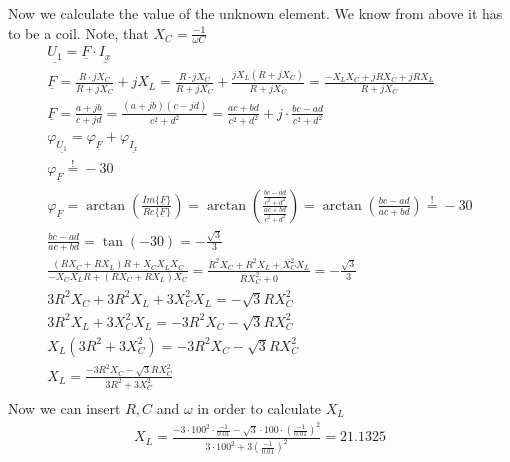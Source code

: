 \documentclass[a4paper]{article}
\begin{document}
Now we calculate the value of the unknown element. We know from above it has to be a coil.
Note, that $X_C = \frac{-1}{\omega C}$
\begin{align*}
	\underline{U_1} = \underline{F} \cdot \underline{I_x}\\
	\underline{F} = \frac{R \cdot jX_C}{R + jX_C} + jX_L =
	\frac{R \cdot jX_C}{R + jX_C} + \frac{jX_L(R+jX_C)}{R + jX_C} = \frac{-X_LX_C + jRX_C + jRX_L}{R + jX_C}\\
	\underline{F} = \frac{a+jb}{c+jd} = \frac{(a+jb)(c-jd)}{c^2+d^2} = \frac{ac+bd}{c^2+d^2} + j\cdot\frac{bc-ad}{c^2+d^2}\\
	\varphi_{\underline{U_1}} = \varphi_{\underline{F}} + \varphi_{\underline{I_x}}\\
	\varphi_{\underline{F}} \overset{!}{=} -30\\
	\varphi_{\underline{F}} = \arctan \left(\frac{Im\{\underline{F}\}}{Re\{\underline{F}\}} \right) =
	\arctan \left(\frac{\frac{bc-ad}{c^2+d^2}}{\frac{ac+bd}{c^2+d^2}} \right) =
	\arctan \left(\frac{bc-ad}{ac+bd} \right) \overset{!}{=} -30\\
	\frac{bc-ad}{ac+bd} = \tan(-30) = -\frac{\sqrt{3}}{3}\\
	\frac{(RX_C+RX_L)R + X_CX_LX_C}{-X_CX_LR + (RX_C + RX_L)X_C} = 
	\frac{R^2X_C + R^2X_L + X_C^2X_L}{RX_C^2 + 0} = -\frac{\sqrt{3}}{3}\\
	3R^2X_C + 3R^2X_L + 3X_C^2X_L = -\sqrt{3}RX_C^2\\
	3R^2X_L + 3X_C^2X_L = -3R^2X_C -\sqrt{3}RX_C^2\\
	X_L(3R^2 + 3X_C^2) = -3R^2X_C -\sqrt{3}RX_C^2\\
	X_L = \frac{-3R^2X_C -\sqrt{3}RX_C^2}{3R^2 + 3X_C^2}\\
\end{align*}
Now we can insert $R, C$ and $\omega$ in order to calculate $X_L$
\begin{align*}
	X_L = \frac{-3 \cdot 100^2 \cdot \frac{-1}{0.01} -\sqrt{3} \cdot 100 \cdot \left(\frac{-1}{0.01}\right)^2}
	{3\cdot 100^2 + 3\left(\frac{-1}{0.01}\right)^2} = 21.1325
\end{align*}
\end{document}
